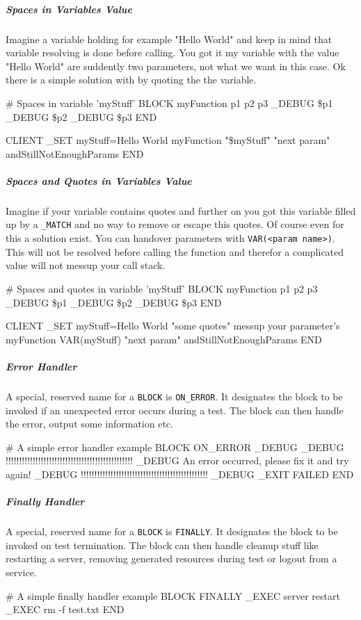 \subparagraph{Spaces in Variables Value}
Imagine a variable holding for example "Hello World" and keep in mind that 
variable resolving is done before calling. You got it my variable with the 
value "Hello World" are suddently two parameters, not what we want in this 
case. Ok there is a simple solution with by quoting the the variable. 
\begin{usplisting}
    # Spaces in variable 'myStuff'
    BLOCK myFunction p1 p2 p3
      _DEBUG \$p1
      _DEBUG \$p2
      _DEBUG \$p3
    END 

    CLIENT
      _SET myStuff=Hello World
      myFunction "\$myStuff" "next param" andStillNotEnoughParams
    END
\end{usplisting}

\subparagraph{Spaces and Quotes in Variables Value}
Imagine if your variable contains quotes and further on you got this variable 
filled up by a \texttt{\_MATCH} and no way to remove or escape this quotes.
Of course even for this a solution exist. You can handover parameters with
\texttt{VAR(<param name>)}. This will not be resolved before calling the function
and therefor a complicated value will not messup your call stack.
\begin{usplisting}
    # Spaces and quotes in variable 'myStuff'
    BLOCK myFunction p1 p2 p3
      _DEBUG \$p1
      _DEBUG \$p2
      _DEBUG \$p3
    END 

    CLIENT
      _SET myStuff=Hello World "some quotes" messup your parameter's
      myFunction VAR(myStuff) "next param" andStillNotEnoughParams
    END
\end{usplisting}


\subparagraph{Error Handler}
A special, reserved name for a \texttt{BLOCK} is \texttt{ON\_ERROR}. It 
designates the block to be invoked if an unexpected error occurs during 
a test. The block can then handle the error, output some information etc. 
\begin{usplisting}
    # A simple error handler example
    BLOCK ON_ERROR
    _DEBUG
    _DEBUG !!!!!!!!!!!!!!!!!!!!!!!!!!!!!!!!!!!!!!!!!!!!!!!
    _DEBUG An error occurred, please fix it and try again!
    _DEBUG !!!!!!!!!!!!!!!!!!!!!!!!!!!!!!!!!!!!!!!!!!!!!!!
    _DEBUG
    _EXIT FAILED
    END
\end{usplisting}

\subparagraph{Finally Handler}
A special, reserved name for a \texttt{BLOCK} is \texttt{FINALLY}. It 
designates the block to be invoked on test termination.  The block can 
then handle cleanup stuff like restarting a server, removing generated
resources during test or logout from a service.
\begin{usplisting}
    # A simple finally handler example
    BLOCK FINALLY
    _EXEC server restart
    _EXEC rm -f test.txt
    END
\end{usplisting}

